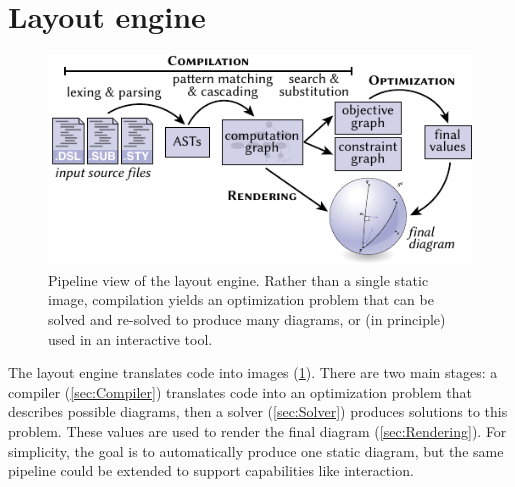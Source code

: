 \section{Layout engine}
\label{sec:LayoutEngine}

\begin{figure}[t]
  \centering
  \includegraphics[scale=1.5]{assets/penrose/CompilationPipeline.pdf}
	\caption{Pipeline view of the layout engine.  Rather than a single static image, compilation yields an optimization problem that can be solved and re-solved to produce many diagrams, or (in principle) used in an interactive tool.\label{fig:CompilationPipeline}}
\end{figure}




The layout engine translates \Penrose{} code into images (\cref{fig:CompilationPipeline}).  There are two main stages: a compiler (\cref{sec:Compiler}) translates code into an optimization problem that describes possible diagrams, then a solver (\cref{sec:Solver}) produces solutions to this problem. These values are used to render the final diagram (\cref{sec:Rendering}). For simplicity, the goal is to automatically produce one static diagram, but the same pipeline could be extended to support capabilities like interaction.

